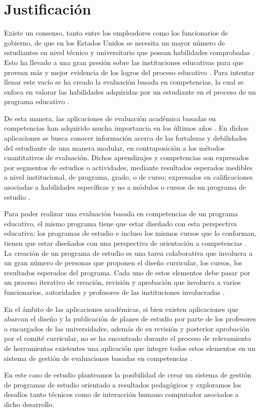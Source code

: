 \section{Justificación}
Existe un consenso, tanto entre los empleadores como los funcionarios de gobierno, de que en los Estados Unidos se necesita un mayor número de estudiantes en nivel técnico y universitario que posean habilidades comprobadas \citep{kuh_knowing_2014}. Esto ha llevado a una gran presión sobre las instituciones educativas para que provean más y mejor evidencia de los logros del proceso educativo \citep{kuh_knowing_2014}. Para intentar llenar este vacío se ha creado la evaluación basada en competencias, la cual se enfoca en valorar las habilidades adquiridas por un estudiante en el proceso de un programa educativo \citep{cartwright2009student}.
 
De esta manera, las aplicaciones de evaluación académica basadas en competencias han adquirido mucha importancia en los últimos años \citep{barrio_minton_evaluating_2016}. En dichas aplicaciones se busca conocer información acerca de las fortalezas y debilidades del estudiante de una manera modular, en contraposición a los métodos cuantitativos de evaluación. Dichos aprendizajes y competencias son expresados por segmentos de estudios o actividades, mediante resultados esperados medibles a nivel institucional, de programa, grado, o de curso; expresados en calificaciones asociadas a habilidades específicas y no a módulos o cursos de un programa de estudio \citep{kuh_using_2015}. 
 
Para poder realizar una evaluación basada en competencias de un programa educativo, el mismo programa tiene que estar diseñado con esta perspectiva educativa: los programas de estudio e incluso los mismos cursos que lo conforman, tienen que estar diseñados con una perspectiva de orientación a competencias \citep{lalor_ensuring_2017}. La creación de un programa de estudio es una tarea colaborativa que involucra a un gran número de personas que proponen el diseño curricular, los cursos, los resultados esperados del programa. Cada uno de estos elementos debe pasar por un proceso iterativo de creación, revisión y aprobación que involucra a varios funcionarios, autoridades y profesores de las instituciones involucradas \citep{boyle_curriculum_2016}. 
 
En el ámbito de las aplicaciones académicas, si bien existen aplicaciones que abarcan el diseño y la publicación de planes de estudio por parte de los profesores o encargados de las universidades, además de su revisión y posterior aprobación por el comité curricular, no se ha encontrado durante el proceso de relevamiento de herramientas existentes una aplicación que integre todos estos elementos en un sistema de gestión de evaluaciones basadas en competencias \citep{curricunet_webpage}\citep{courseleaf_webpage}\citep{deca_webpage}.
 
En este caso de estudio \citep{runeson2012case} planteamos la posibilidad de crear un sistema de gestión de programas de estudio orientado a resultados pedagógicos y exploramos los desafíos tanto técnicos como de interacción humano computador asociados a dicho desarrollo.